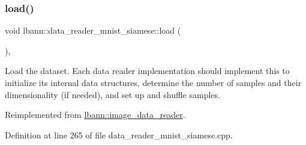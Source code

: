 \subsubsection{\texorpdfstring{load()}{load()}}
{\footnotesize\ttfamily void lbann\+::data\+\_\+reader\+\_\+mnist\+\_\+siamese\+::load (\begin{DoxyParamCaption}{ }\end{DoxyParamCaption})\hspace{0.3cm}{\ttfamily [override]}, {\ttfamily [virtual]}}

Load the dataset. Each data reader implementation should implement this to initialize its internal data structures, determine the number of samples and their dimensionality (if needed), and set up and shuffle samples. 

Reimplemented from \hyperlink{classlbann_1_1image__data__reader_a99cb80242d7d20bc1e8baeaff25ff790}{lbann\+::image\+\_\+data\+\_\+reader}.



Definition at line 265 of file data\+\_\+reader\+\_\+mnist\+\_\+siamese.\+cpp.


